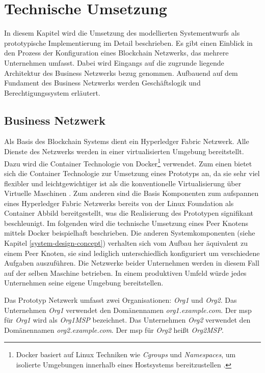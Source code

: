 \section{Technische Umsetzung}
In diesem Kapitel wird die Umsetzung des modellierten Systementwurfs als prototypische Implementierung im Detail beschrieben. Es gibt einen Einblick in den Prozess der Konfiguration eines Blockchain Netzwerks, das mehrere Unternehmen umfasst. Dabei wird Eingangs auf die zugrunde liegende Architektur des Business Netzwerks bezug genommen. Aufbauend auf dem Fundament des Business Netzwerks werden Geschäftslogik und Berechtigungssystem erläutert.

\subsection{Business Netzwerk}
Als Basis des Blockchain Systems dient ein Hyperledger Fabric Netzwerk. Alle Dienste des Netzwerks werden in einer virtualisierten Umgebung bereitstellt. Dazu wird die Container Technologie von Docker\footnote{Docker basiert auf Linux Techniken wie \textit{Cgroups} und \textit{Namespaces}, um isolierte Umgebungen innerhalb eines Hostsystems bereitzustellen \citep{Bengel2008,Oeggl2019}.} verwendet. Zum einen bietet sich die Container Technologie zur Umsetzung eines Prototyps an, da sie sehr viel flexibler und leichtgewichtiger ist als die konventionelle Virtualisierung über Virtuelle Maschinen \citep{Ahmed2018}. Zum anderen sind die Basis Komponenten zum aufspannen eines Hyperledger Fabric Netzwerks bereits von der Linux Foundation als Container Abbild bereitgestellt, was die Realisierung des Prototypen signifikant beschleunigt. Im folgenden wird die technische Umsetzung eines Peer Knotens mittels Docker beispielhaft beschrieben. Die anderen Systemkomponenten (siehe Kapitel \ref{system-design-concept}) verhalten sich vom Aufbau her äquivalent zu einem Peer Knoten, sie sind lediglich unterschiedlich konfiguriert um verschiedene Aufgaben auszuführen. Die Netzwerke beider Unternehmen werden in diesem Fall auf der selben Maschine betrieben. In einem produktiven Umfeld würde jedes Unternehmen seine eigene Umgebung bereitstellen.

Das Prototyp Netzwerk umfasst zwei Organisationen: \textit{Org1} und \textit{Org2}. Das Unternehmen \textit{Org1} verwendet den Domänennamen \textit{org1.example.com}. Der \acf{msp} für \textit{Org1} wird als \textit{Org1MSP} bezeichnet. Das Unternehmen \textit{Org2} verwendet den Domänennamen \textit{org2.example.com}. Der \acf{msp} für \textit{Org2} heißt \textit{Org2MSP}.

